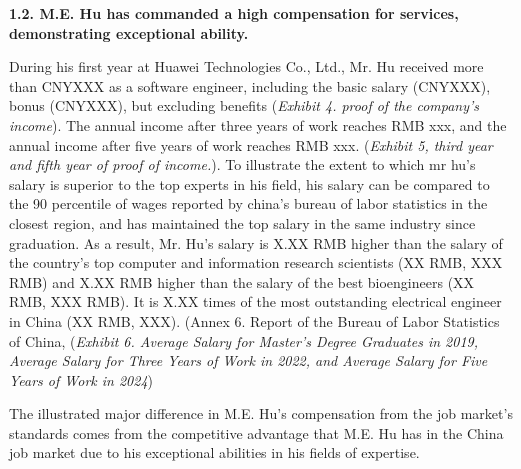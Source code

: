 \documentclass{article}
\begin{document}
{\bf 1.2. M.E. Hu has commanded a high compensation for services, demonstrating exceptional ability. }

During his first year at Huawei Technologies Co., Ltd., Mr. Hu received more than CNYXXX as a software engineer, including the basic salary (CNYXXX), bonus (CNYXXX), but excluding benefits ({\it  Exhibit 4. proof of the company's income}). The annual income after three years of work reaches RMB xxx, and the annual income after five years of work reaches RMB xxx. ({\it Exhibit 5, third year and fifth year of proof of income.}). To illustrate the extent to which mr hu's salary is superior to the top experts in his field, his salary can be compared to the 90 percentile of wages reported by china's bureau of labor statistics in the closest region, and has maintained the top salary in the same industry since graduation. As a result, Mr. Hu's salary is X.XX RMB higher than the salary of the country's top computer and information research scientists (XX RMB, XXX RMB) and X.XX RMB higher than the salary of the best bioengineers (XX RMB, XXX RMB). It is X.XX times of the most outstanding electrical engineer in China (XX RMB, XXX). (Annex 6. Report of the Bureau of Labor Statistics of China, ({\it Exhibit 6. Average Salary for Master's Degree Graduates in 2019, Average Salary for Three Years of Work in 2022, and Average Salary for Five Years of Work in 2024})
 

The illustrated major difference in M.E. Hu's compensation from the job market's standards comes from the competitive advantage that M.E. Hu has in the China job market due to his exceptional abilities in his fields of expertise. 
\end{document}
